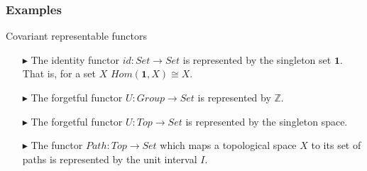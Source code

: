 \documentclass[10.5pt,compress]{beamer}
\begin{document}
\begin{frame}\label{frame : eg of cov rep func}
\frametitle{Examples}

\begin{block}{Covariant representable functors}
\begin{enumerate}

\item[$\blacktriangleright$] The identity functor $id : Set \to Set$ is represented by
the singleton set $\mathbf{1}$. That is, for a set $X$
$Hom(\mathbf{1}, X) \cong X$.

\item[$\blacktriangleright$] The forgetful functor $U : Group \to Set$ is represented by
$\mathbb{Z}$.

\item[$\blacktriangleright$] The forgetful functor $U : Top \to Set$ is represented by the
singleton space.

\item[$\blacktriangleright$] The functor $Path : Top \to Set$ which maps a topological space
$X$ to its set of paths is represented by the unit interval $I$.
\end{enumerate}

\end{block}

\end{frame}

\end{document}
